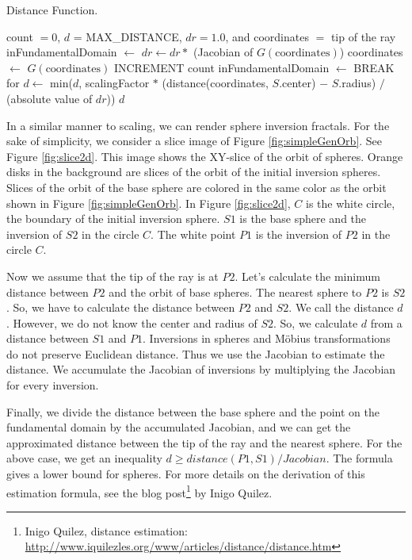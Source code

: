 \begin{algorithm}
 \caption{Distance Function.}
 \label{iis3d}
 \begin{algorithmic}
  \REQUIRE count $= 0$, $d$ = MAX\_DISTANCE, $dr = 1.0$, and coordinates
  $=$ tip of the ray
  \STATE inFundamentalDomain $\leftarrow$ \TRUE
  \STATE $dr \leftarrow dr * $ (Jacobian of $G(\text{coordinates})$)
  \STATE coordinates $\leftarrow$ $G(\text{coordinates})$
  \STATE INCREMENT count
  \STATE inFundamentalDomain $\leftarrow$ \FALSE
  \ENDIF
  \ENDFOR
  \STATE BREAK for
  \ENDIF
  \ENDFOR
  \STATE $d \leftarrow$ min($d$, scalingFactor $*$ (distance(coordinates, $S$.center) $-$
  $S$.radius) $/$ (absolute value of $dr$))
  \ENDFOR
  \RETURN $d$
 \end{algorithmic}
\end{algorithm}

\noindent In a similar manner to scaling, we can render sphere inversion
fractals.
For the sake of simplicity, we consider a slice image of Figure
\ref{fig:simpleGenOrb}.
See Figure \ref{fig:slice2d}. This image shows the XY-slice of the orbit
of spheres.
Orange disks in the background are slices of the orbit of the initial inversion spheres.
Slices of the orbit of the base sphere are colored in
the same color as the orbit shown in Figure \ref{fig:simpleGenOrb}.
In Figure \ref{fig:slice2d},
$C$ is the white circle, the boundary of the initial inversion sphere.
$S1$ is the base sphere and the inversion of $S2$ in the circle $C$. 
The white point $P1$ is the inversion of $P2$ in the circle $C$.

Now we assume that the tip of the ray is at $P2$.
Let's calculate the minimum distance between
$P2$ and the orbit of base spheres.
The nearest sphere to $P2$ is $S2$.
So, we have to calculate the distance between $P2$ and $S2$.
We call the distance $d$.
However, we do not know the center and radius of $S2$.
So, we calculate $d$ from a distance between $S1$ and $P1$.
Inversions in spheres and M\"obius transformations do not preserve
Euclidean distance.
Thus we use the Jacobian to estimate the distance.
We accumulate the Jacobian of inversions by multiplying the Jacobian for
every inversion.

Finally, we divide the distance between the base sphere and the point on
the fundamental domain by the accumulated Jacobian, and we can get the
approximated distance between the tip of the ray and the nearest sphere.
For the above case, we get an inequality $d \geq distance(P1, S1)/Jacobian$.
The formula gives a lower bound for spheres.
For more details on the derivation of this estimation formula, see the
blog post\footnote{Inigo Quilez, distance estimation:
\url{http://www.iquilezles.org/www/articles/distance/distance.htm}}
by Inigo Quilez.

